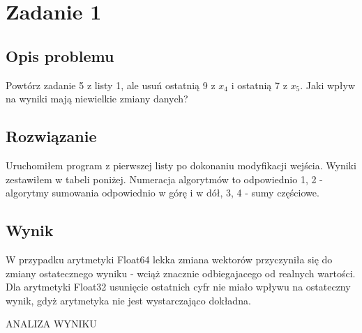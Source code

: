 \section{Zadanie 1}
\subsection{Opis problemu}
Powtórz zadanie 5 z listy 1, ale usuń ostatnią 9 z $ x_4 $ i ostatnią 7 z $ x_5 $. Jaki wpływ na
wyniki mają niewielkie zmiany danych?
\subsection{Rozwiązanie}
Uruchomiłem program z pierwszej listy po dokonaniu modyfikacji wejścia. Wyniki zestawiłem w tabeli poniżej. Numeracja algorytmów to odpowiednio 1, 2 - algorytmy sumowania odpowiednio w górę i w dół, 3, 4 - sumy częściowe.
\subsection{Wynik}
\begin{center}

\end{center}
W przypadku arytmetyki Float64 lekka zmiana wektorów przyczyniła się do zmiany ostatecznego wyniku - wciąż znacznie odbiegajacego od realnych wartości. Dla arytmetyki Float32 usunięcie ostatnich cyfr nie miało wpływu na ostateczny wynik, gdyż arytmetyka nie jest wystarczająco dokładna.

ANALIZA WYNIKU
